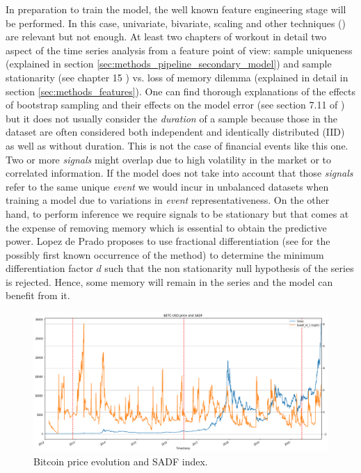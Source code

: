In preparation to train the model, the well known feature engineering stage will be performed. In this case, univariate, bivariate, scaling and other techniques (\cite{feature_engineering}) are relevant but not enough. At least two chapters of \cite{lopez_de_prado} workout in detail two aspect of the time series analysis from a feature point of view: sample uniqueness (explained in section \ref{sec:methods_pipeline_secondary_model}) and sample stationarity (see chapter 15 \cite{time_series_analysis}) vs. loss of memory dilemma (explained in detail in section \ref{sec:methods_features}). One can find thorough explanations of the effects of bootstrap sampling and their effects on the model error (see section 7.11 of \cite{elements_of_statistical_learning}) but it does not usually consider the \emph{duration} of a sample because those in the dataset are often considered both independent and identically distributed (IID) as well as without duration. This is not the case of financial events like this one. Two or more \emph{signals} might overlap due to high volatility in the market or to correlated information. If the model does not take into account that those \emph{signals} refer to the same unique \emph{event} we would incur in unbalanced datasets when training a model due to variations in \emph{event} representativeness. On the other hand, to perform inference we require signals to be stationary but that comes at the expense of removing memory which is essential to obtain the predictive power. Lopez de Prado proposes to use fractional differentiation (see \cite{frac_diff_paper} for the possibly first known occurrence of the method) to determine the minimum differentiation factor $d$ such that the non stationarity null hypothesis of the series is rejected. Hence, some memory will remain in the series and the model can benefit from it.

\begin{figure}[!htb]
    \centering
    \includegraphics[width=\textwidth]{introduction/images/sadf_vs_price.png}
    \caption{Bitcoin price evolution and SADF index.}
    \label{fig:sadf_vs_price}
\end{figure}

